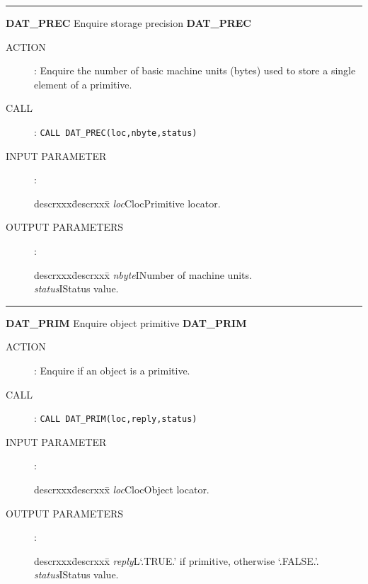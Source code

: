\rule{\textwidth}{0.3mm}
{\Large {\bf DAT\_PREC} \hfill Enquire storage precision \hfill {\bf DAT\_PREC}}
\begin{description}
\item [ACTION]:
Enquire the number of basic machine units (bytes) used to store a single element
of a primitive.
\item [CALL]:
{\tt CALL DAT\_PREC(loc,nbyte,status)}
\item [INPUT PARAMETER]:
\begin{tabbing}
descrxxx\=descrxxx\=\kill
{\em loc}\>Cloc\>Primitive locator.
\end{tabbing}
\item [OUTPUT PARAMETERS]:
\begin{tabbing}
descrxxx\=descrxxx\=\kill
{\em nbyte}\>I\>Number of machine units.\\
{\em status}\>I\>Status value.
\end{tabbing}
\end{description}
\goodbreak
\rule{\textwidth}{0.3mm}
{\Large {\bf DAT\_PRIM} \hfill Enquire object primitive \hfill {\bf DAT\_PRIM}}
\begin{description}
\item [ACTION]:
Enquire if an object is a primitive.
\item [CALL]:
{\tt CALL DAT\_PRIM(loc,reply,status)}
\item [INPUT PARAMETER]:
\begin{tabbing}
descrxxx\=descrxxx\=\kill
{\em loc}\>Cloc\>Object locator.
\end{tabbing}
\item [OUTPUT PARAMETERS]:
\begin{tabbing}
descrxxx\=descrxxx\=\kill
{\em reply}\>L\>`.TRUE.' if primitive, otherwise `.FALSE.'.\\
{\em status}\>I\>Status value.
\end{tabbing}
\end{description}
\newpage
